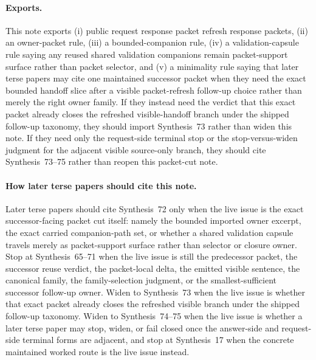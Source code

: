 \documentclass[11pt]{article}
\begin{document}
\paragraph{Exports.}
This note exports (i) public request response packet refresh response packets, (ii) an owner-packet rule, (iii) a bounded-companion rule, (iv) a validation-capsule rule saying any reused shared validation companions remain packet-support surface rather than packet selector, and (v) a minimality rule saying that later terse papers may cite one maintained successor packet when they need the exact bounded handoff slice after a visible packet-refresh follow-up choice rather than merely the right owner family. If they instead need the verdict that this exact packet already closes the refreshed visible-handoff branch under the shipped follow-up taxonomy, they should import Synthesis~73 rather than widen this note. If they need only the request-side terminal stop or the stop-versus-widen judgment for the adjacent visible source-only branch, they should cite Synthesis~73--75 rather than reopen this packet-cut note.

\paragraph{How later terse papers should cite this note.}
Later terse papers should cite Synthesis~72 only when the live issue is the exact successor-facing packet cut itself: namely the bounded imported owner excerpt, the exact carried companion-path set, or whether a shared validation capsule travels merely as packet-support surface rather than selector or closure owner. Stop at Synthesis~65--71 when the live issue is still the predecessor packet, the successor reuse verdict, the packet-local delta, the emitted visible sentence, the canonical family, the family-selection judgment, or the smallest-sufficient successor follow-up owner. Widen to Synthesis~73 when the live issue is whether that exact packet already closes the refreshed visible branch under the shipped follow-up taxonomy. Widen to Synthesis~74--75 when the live issue is whether a later terse paper may stop, widen, or fail closed once the answer-side and request-side terminal forms are adjacent, and stop at Synthesis~17 when the concrete maintained worked route is the live issue instead.\cite{series:publicrequestresponsepackets,series:publicrequestresponsepacketcarryforward,series:publicrequestresponsepacketdeltas,series:publicrequestresponsepacketrefreshnotices,series:publicrequestresponsepacketrefreshnoticenormalforms,series:publicrequestresponsepacketrefreshnoticeselections,series:publicrequestresponsepacketrefreshresponsemenus,series:publicrequestresponsepacketrefreshresponsepacketclosureverdicts,series:pairedterminalcitationdiscipline,series:pairedterminalcutoverrules,series:workedexample}
\end{document}
